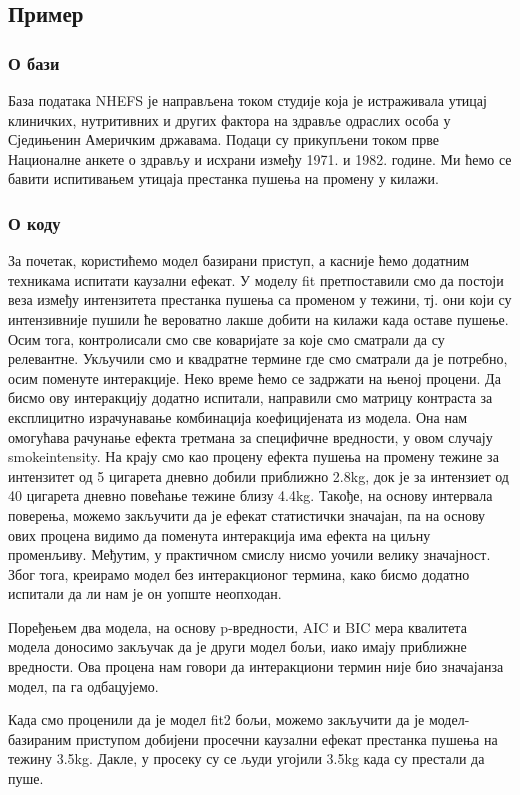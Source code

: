 \documentclass[12pt, a4paper]{article}
\begin{document}
\subsection{Пример}
   \subsubsection{О бази}
База података NHEFS је направљена током студије која је истраживала утицај клиничких, нутритивних и других фактора на здравље одраслих особа у Сједињенин Америчким државама. Подаци су прикупљени током прве Националне анкете о здрављу и исхрани између 1971. и 1982. године. Ми ћемо се бавити испитивањем утицаја престанка пушења на промену у килажи.
   \subsubsection{О коду}
За почетак, користићемо модел базирани приступ, а касније ћемо додатним техникама испитати каузални ефекат. У моделу fit претпоставили смо да постоји веза између интензитета престанка пушења са променом у тежини, тј. они који су интензивније пушили ће вероватно лакше добити на килажи када оставе пушење. Осим тога, контролисали смо све коваријате за које смо сматрали да су релевантне.  Укључили смо и квадратне термине где смо сматрали да је потребно, осим поменуте интеракције. Неко време ћемо се задржати на њеној процени. Да бисмо ову интеракцију додатно испитали, направили смо матрицу контраста за експлицитно израчунавање комбинација коефицијената из модела. Она нам омогућава рачунање ефекта третмана за специфичне вредности, у овом случају smokeintensity. На крају смо као процену ефекта пушења на промену тежине за интензитет од 5 цигарета дневно добили приближно 2.8kg, док је за интензиет од 40 цигарета дневно повећање тежине близу 4.4kg. Такође, на основу интервала поверења, можемо закључити да је ефекат статистички значајан, па на основу ових процена видимо да поменута интеракција има ефекта на циљну променљиву. Међутим, у практичном смислу нисмо уочили велику значајност. Због тога, креирамо модел без интеракционог термина, како бисмо додатно испитали да ли нам је он уопште неопходан. 

\par Поређењем два модела, на основу p-вредности, $\text{AIC}$ и $\text{BIC}$ мера квалитета модела доносимо закључак да је други модел бољи, иако имају приближне вредности. Ова процена нам говори да интеракциони термин није био значајанза модел, па га одбацујемо. 

Када смо проценили да је модел fit2 бољи, можемо закључити да је модел-базираним приступом добијени просечни каузални ефекат престанка пушења на тежину 3.5kg. Дакле, у просеку су се људи угојили 3.5kg када су престали да пуше.
\end{document}
